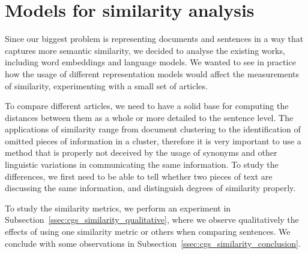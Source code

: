 \section{\statusgreen Models for similarity analysis}
\label{sec:cgs_similarity}
Since our biggest problem is representing documents and sentences in a way that captures more semantic similarity, we decided to analyse the existing works, including word embeddings and language models.
We wanted to see in practice how the usage of different representation models would affect the measurements of similarity, experimenting with a small set of articles. 

To compare different articles, we need to have a
solid base for computing the distances between them as a whole or more detailed to the sentence level.
The applications of similarity range from document clustering to the identification of omitted pieces of information in a cluster, therefore it is very important to use a method that is properly not deceived by the usage of synonyms and other linguistic variations in communicating the same information. To study the differences, we first need to be able to tell whether two pieces of text are discussing the same information, and distinguish degrees of similarity properly.

To study the similarity metrics, we perform an experiment in Subsection~\ref{ssec:cgs_similarity_qualitative}, where we observe qualitatively the effects of using one similarity metric or others when comparing sentences. 
We conclude with some observations in Subsection~\ref{ssec:cgs_similarity_conclusion}.


